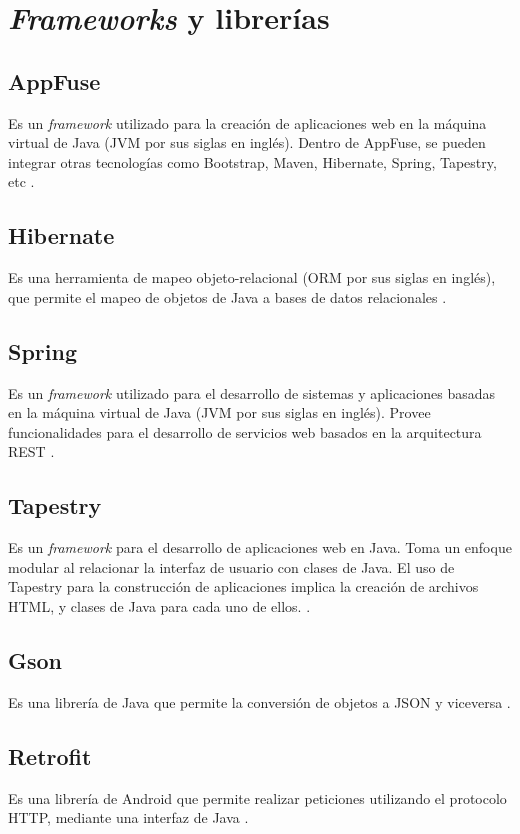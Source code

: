 \section{\textit{Frameworks} y librerías} \label{Frameworks y librerias}

\subsection{AppFuse}
Es un \textit{framework} utilizado para la creación de aplicaciones web en la máquina virtual de Java (JVM por sus siglas en inglés). Dentro de AppFuse, se pueden integrar otras tecnologías como Bootstrap, Maven, Hibernate, Spring, Tapestry, etc \cite{APF1}.

\subsection{Hibernate}
Es una herramienta de mapeo objeto-relacional (ORM por sus siglas en inglés), que permite el mapeo de objetos de Java a bases de datos relacionales \cite{HBR1}.

\subsection{Spring}
Es un \textit{framework} utilizado para el desarrollo de sistemas y aplicaciones basadas en la máquina virtual de Java (JVM por sus siglas en inglés). Provee funcionalidades para el desarrollo de servicios web basados en la arquitectura REST \cite{SPRNG0}.

\subsection{Tapestry}
Es un \textit{framework} para el desarrollo de aplicaciones web en Java. Toma un enfoque modular al relacionar la interfaz de usuario con clases de Java. El uso de Tapestry para la construcción de aplicaciones implica la creación de archivos HTML, y clases de Java para cada uno de ellos. \cite{ATP1}.

\subsection{Gson}
Es una librería de Java que permite la conversión de objetos a JSON y viceversa \cite{GSN1}
.
\subsection{Retrofit}
Es una librería de Android que permite realizar peticiones utilizando el protocolo HTTP, mediante una interfaz de Java \cite{RFT1}.

